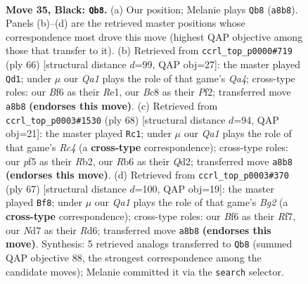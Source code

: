 \documentclass[11pt]{article}
\begin{document}
\clearpage

\begin{figure}[p]\centering
\begin{subfigure}{0.46\textwidth}\centering
\resizebox{\linewidth}{!}{%
\newchessgame
\chessboard[
  setfen={q1b3k1/p2n1r1p/1r3b2/2p2P2/Pp1pQ3/1P4N1/R3P3/1NBK1R2 b - - 2 35},
  showmover=false,
  pgfstyle=straightmove, color=movearrow, markmove={a8-b8}
]}
\caption{}
\end{subfigure}\hfill
\begin{subfigure}{0.46\textwidth}\centering
\resizebox{\linewidth}{!}{%
\newchessgame
\chessboard[
  setfen={2r3k1/5pb1/1pr1n1p1/3q3p/QB1pN2P/P2P2P1/5P2/1R2R1K1 w - - 4 34},
  showmover=false,
  pgfstyle=straightmove, color=movearrow, markmove={a4-d1}
]}
\caption{}
\end{subfigure}
\\[4pt]
\begin{subfigure}{0.46\textwidth}\centering
\resizebox{\linewidth}{!}{%
\newchessgame
\chessboard[
  setfen={3r2k1/1r2npp1/pnpqp1p1/8/2RP2P1/1P5P/PR1QNPB1/6K1 w - - 3 35},
  showmover=false,
  pgfstyle=straightmove, color=movearrow, markmove={c4-c1}
]}
\caption{}
\end{subfigure}\hfill
\begin{subfigure}{0.46\textwidth}\centering
\resizebox{\linewidth}{!}{%
\newchessgame
\chessboard[
  setfen={6k1/5rb1/3rp2p/p4p1N/3n1P1Q/2q3P1/R5PK/3B1R2 b - - 2 34},
  showmover=false,
  pgfstyle=straightmove, color=movearrow, markmove={g7-f8}
]}
\caption{}
\end{subfigure}
\caption{\textbf{Move 35, Black: \texttt{Qb8}.} (a) Our position; Melanie plays \texttt{Qb8} (\texttt{a8b8}). Panels (b)--(d) are the retrieved master positions whose correspondence most drove this move (highest QAP objective among those that transfer to it). (b) Retrieved from \texttt{ccrl\_top\_p0000\#719} (ply 66) [structural distance $d$=99, QAP obj=27]: the master played \texttt{Qd1}; under $\mu$ our \emph{Qa1} plays the role of that game's \emph{Qa4}; cross-type roles: our \emph{B}f6 as their \emph{R}e1, our \emph{B}c8 as their \emph{P}f2; transferred move \texttt{a8b8} \textbf{(endorses this move)}. (c) Retrieved from \texttt{ccrl\_top\_p0003\#1530} (ply 68) [structural distance $d$=94, QAP obj=21]: the master played \texttt{Rc1}; under $\mu$ our \emph{Qa1} plays the role of that game's \emph{Rc4} (a \textbf{cross-type} correspondence); cross-type roles: our \emph{p}f5 as their \emph{R}b2, our \emph{R}b6 as their \emph{Q}d2; transferred move \texttt{a8b8} \textbf{(endorses this move)}. (d) Retrieved from \texttt{ccrl\_top\_p0003\#370} (ply 67) [structural distance $d$=100, QAP obj=19]: the master played \texttt{Bf8}; under $\mu$ our \emph{Qa1} plays the role of that game's \emph{Bg2} (a \textbf{cross-type} correspondence); cross-type roles: our \emph{B}f6 as their \emph{R}f7, our \emph{N}d7 as their \emph{R}d6; transferred move \texttt{a8b8} \textbf{(endorses this move)}. Synthesis: 5 retrieved analogs transferred to \texttt{Qb8} (summed QAP objective 88, the strongest correspondence among the candidate moves); Melanie committed it via the \texttt{search} selector.}
\label{fig:thought-m69}
\end{figure}
\end{document}
